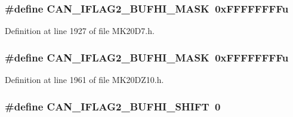 \subsubsection[{\texorpdfstring{C\+A\+N\+\_\+\+I\+F\+L\+A\+G2\+\_\+\+B\+U\+F\+H\+I\+\_\+\+M\+A\+SK}{CAN_IFLAG2_BUFHI_MASK}}]{\setlength{\rightskip}{0pt plus 5cm}\#define C\+A\+N\+\_\+\+I\+F\+L\+A\+G2\+\_\+\+B\+U\+F\+H\+I\+\_\+\+M\+A\+SK~0x\+F\+F\+F\+F\+F\+F\+F\+Fu}\hypertarget{group___c_a_n___register___masks_ga20dcde29d52484685d8b0c2bb9ba2ad7}{}\label{group___c_a_n___register___masks_ga20dcde29d52484685d8b0c2bb9ba2ad7}


Definition at line 1927 of file M\+K20\+D7.\+h.

\subsubsection[{\texorpdfstring{C\+A\+N\+\_\+\+I\+F\+L\+A\+G2\+\_\+\+B\+U\+F\+H\+I\+\_\+\+M\+A\+SK}{CAN_IFLAG2_BUFHI_MASK}}]{\setlength{\rightskip}{0pt plus 5cm}\#define C\+A\+N\+\_\+\+I\+F\+L\+A\+G2\+\_\+\+B\+U\+F\+H\+I\+\_\+\+M\+A\+SK~0x\+F\+F\+F\+F\+F\+F\+F\+Fu}\hypertarget{group___c_a_n___register___masks_ga20dcde29d52484685d8b0c2bb9ba2ad7}{}\label{group___c_a_n___register___masks_ga20dcde29d52484685d8b0c2bb9ba2ad7}


Definition at line 1961 of file M\+K20\+D\+Z10.\+h.

\subsubsection[{\texorpdfstring{C\+A\+N\+\_\+\+I\+F\+L\+A\+G2\+\_\+\+B\+U\+F\+H\+I\+\_\+\+S\+H\+I\+FT}{CAN_IFLAG2_BUFHI_SHIFT}}]{\setlength{\rightskip}{0pt plus 5cm}\#define C\+A\+N\+\_\+\+I\+F\+L\+A\+G2\+\_\+\+B\+U\+F\+H\+I\+\_\+\+S\+H\+I\+FT~0}\hypertarget{group___c_a_n___register___masks_gaf26eb008c22bfc3871ef7cb6d87c7774}{}\label{group___c_a_n___register___masks_gaf26eb008c22bfc3871ef7cb6d87c7774}


